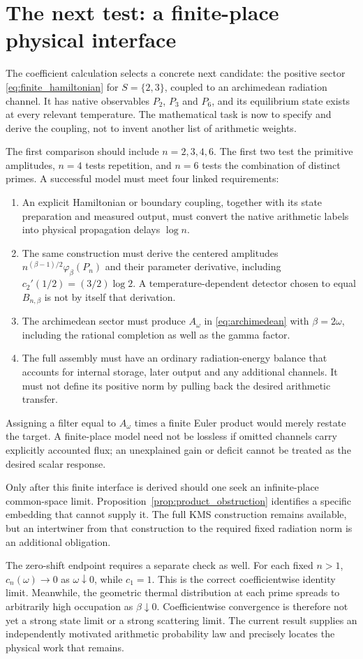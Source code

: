 \section{The next test: a finite-place physical interface}
\label{sec:interface}

The coefficient calculation selects a concrete next candidate: the
positive sector \eqref{eq:finite_hamiltonian} for $S=\{2,3\}$,
coupled to an archimedean radiation channel. It has native observables
$P_2$, $P_3$ and $P_6$, and its equilibrium state exists at every
relevant temperature. The mathematical task is now to specify and
derive the coupling, not to invent another list of arithmetic weights.

The first comparison should include $n=2,3,4,6$. The first two test
the primitive amplitudes, $n=4$ tests repetition, and $n=6$ tests the
combination of distinct primes. A successful model must meet four
linked requirements:
\begin{enumerate}
\item An explicit Hamiltonian or boundary coupling, together with its
state preparation and measured output, must convert the native
arithmetic labels into physical propagation delays $\log n$.
\item The same construction must derive the centered amplitudes
$n^{(\beta-1)/2}\varphi_\beta(P_n)$ and their parameter derivative,
including $c_2'(1/2)=(3/2)\log2$. A temperature-dependent detector
chosen to equal $B_{n,\beta}$ is not by itself that derivation.
\item The archimedean sector must produce
$A_\omega$ in \eqref{eq:archimedean} with $\beta=2\omega$, including
the rational completion as well as the gamma factor.
\item The full assembly must have an ordinary radiation-energy
balance that accounts for internal storage, later output and any
additional channels. It must not define its positive norm by
pulling back the desired arithmetic transfer.
\end{enumerate}
Assigning a filter equal to $A_\omega$ times a finite Euler product
would merely restate the target. A finite-place model need not be
lossless if omitted channels carry explicitly accounted flux; an
unexplained gain or deficit cannot be treated as the desired scalar
response.

Only after this finite interface is derived should one seek an
infinite-place common-space limit. Proposition~\ref{prop:product_obstruction}
identifies a specific embedding that cannot supply it. The full
KMS construction remains available, but an intertwiner from that
construction to the required fixed radiation norm is an additional
obligation.

The zero-shift endpoint requires a separate check as well. For each
fixed $n>1$, $c_n(\omega)\to0$ as $\omega\downarrow0$, while
$c_1=1$. This is the correct coefficientwise identity limit.
Meanwhile, the geometric thermal distribution at each prime spreads
to arbitrarily high occupation as $\beta\downarrow0$. Coefficientwise
convergence is therefore not yet a strong state limit or a strong
scattering limit. The current result supplies an independently
motivated arithmetic probability law and precisely locates the
physical work that remains.
